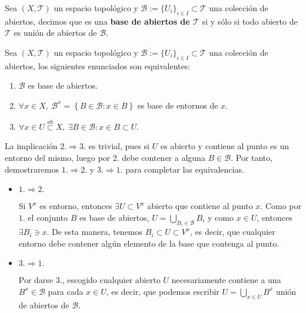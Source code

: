 \begin{defi}
Sea $(X, \mathcal{T})$ un espacio topológico y $\mathcal{B} :=\{U_i\}_{i\in I}\subset \mathcal{T}$ una colección de abiertos, decimos que es una \textbf{base de abiertos de $\mathcal{T}$} si y sólo si todo abierto de $\mathcal{T}$ es unión de abiertos de $\mathcal{B}$.
\end{defi}

\begin{prop}
Sea $(X, \mathcal{T})$ un espacio topológico y $\mathcal{B} :=\{U_i\}_{i\in I}\subset \mathcal{T}$ una colección de abiertos, los siguientes enunciados son equivalentes:
\begin{enumerate}
\item $\mathcal{B}$ es base de abiertos. 
\item $\forall x \in X, \ \mathcal{B}^x = \left\{ B \in \mathcal{B} : x \in B \right\}$ es base de entornos de $x$.
\item $\forall x \in U \stackrel{ab}{\subset} X, \ \exists B \in \mathcal{B} : x \in B \subset U$.
\end{enumerate}
\end{prop}

\begin{demo}
La implicación $2. \Rightarrow 3.$ es trivial, pues si $U$ es abierto y contiene al punto es un entorno del mismo, luego por $2.$ debe contener a alguna $B\in \mathcal{B}$. Por tanto, demostraremos $1. \Rightarrow 2.$ y $3. \Rightarrow 1.$ para completar las equivalencias.
\begin{itemize}
\item $1. \Rightarrow 2.$

Si $V^x$ es entorno, entonces $\exists U \subset V^x$ abierto que contiene al punto $x$. Como por $1.$ el conjunto $B$ es base de abiertos, $U = \bigcup_{B_i \in \mathcal{B}} B_i$ y como $x\in U$, entonces $\exists B_i \ni x$. De esta manera, tenemos $B_i \subset U \subset V^x$, es decir, que cualquier entorno debe contener algún elemento de la base que contenga al punto.

\item $3. \Rightarrow 1.$

Por darse $3.$, escogido cualquier abierto $U$ necesariamente contiene a una $B^x\in \mathcal{B}$ para cada $x\in U$, es decir, que podemos escribir $U = \bigcup_{x \in U} B^x$ unión de abiertos de $\mathcal{B}$.
\end{itemize}
\end{demo}

